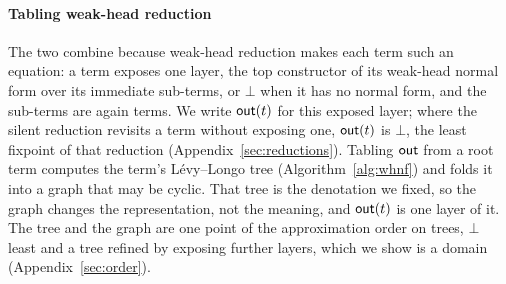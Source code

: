 \paragraph{Tabling weak-head reduction}
The two combine because weak-head reduction makes each term such an equation: a term exposes one layer, the top constructor of its weak-head normal form over its immediate sub-terms, or $\bot$ when it has no normal form, and the sub-terms are again terms. We write $\mathsf{out}(t)$ for this exposed layer; where the silent reduction revisits a term without exposing one, $\mathsf{out}(t)$ is $\bot$, the least fixpoint of that reduction (Appendix~\ref{sec:reductions}). Tabling $\mathsf{out}$ from a root term computes the term's L\'evy--Longo tree (Algorithm~\ref{alg:whnf}) and folds it into a graph that may be cyclic. That tree is the denotation we fixed, so the graph changes the representation, not the meaning, and $\mathsf{out}(t)$ is one layer of it. The tree and the graph are one point of the approximation order on trees, $\bot$ least and a tree refined by exposing further layers, which we show is a domain (Appendix~\ref{sec:order}).

